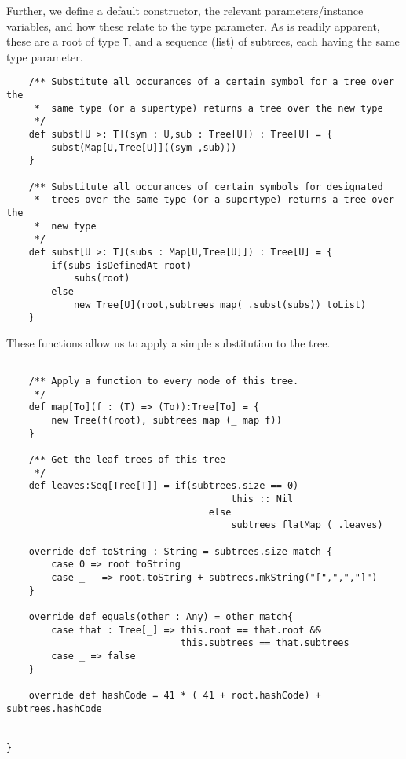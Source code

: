 Further, we define a default constructor, the relevant parameters/instance
variables, and how these relate to the type parameter. As is readily
apparent, these are a root of type \texttt{T}, and a sequence (list) of
subtrees, each having the same type parameter.

\begin{verbatim}
	/** Substitute all occurances of a certain symbol for a tree over the
	 *  same type (or a supertype) returns a tree over the new type
	 */
	def subst[U >: T](sym : U,sub : Tree[U]) : Tree[U] = {
		subst(Map[U,Tree[U]]((sym ,sub)))
	}

	/** Substitute all occurances of certain symbols for designated 
	 *  trees over the same type (or a supertype) returns a tree over the
	 *  new type
	 */
	def subst[U >: T](subs : Map[U,Tree[U]]) : Tree[U] = {
		if(subs isDefinedAt root)
			subs(root)
		else
			new Tree[U](root,subtrees map(_.subst(subs)) toList)
	}
\end{verbatim}

These functions allow us to apply a simple substitution to the tree. 

\begin{verbatim}
	
	/** Apply a function to every node of this tree.
	 */
	def map[To](f : (T) => (To)):Tree[To] = {
		new Tree(f(root), subtrees map (_ map f))
	}
	
	/** Get the leaf trees of this tree
	 */
	def leaves:Seq[Tree[T]] = if(subtrees.size == 0)
										this :: Nil 
									else
										subtrees flatMap (_.leaves)

	override def toString : String = subtrees.size match { 
		case 0 => root toString
		case _   => root.toString + subtrees.mkString("[",",","]") 
	}

	override def equals(other : Any) = other match{
		case that : Tree[_] => this.root == that.root &&
							   this.subtrees == that.subtrees
		case _ => false
	}

	override def hashCode = 41 * ( 41 + root.hashCode) + subtrees.hashCode
	

}

\end{verbatim}




